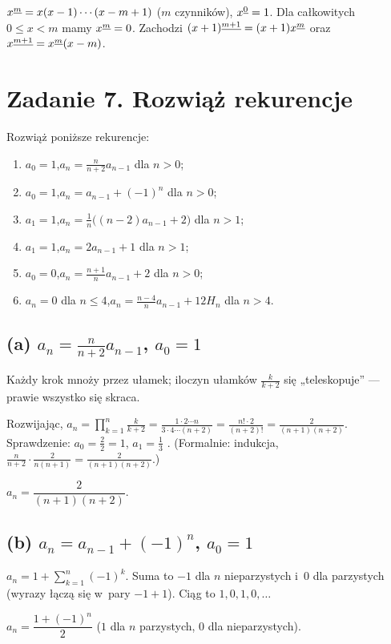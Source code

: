 \documentclass[11pt]{article}
\begin{document}
\begin{definicja}
$x^{\underline{m}} = x(x-1)\cdots(x-m+1)$ ($m$ czynników), $x^{\underline{0}}=1$.
Dla całkowitych $0\le x<m$ mamy $x^{\underline{m}}=0$. Zachodzi
$(x+1)^{\underline{m+1}} = (x+1)x^{\underline{m}}$ oraz $x^{\underline{m+1}} = x^{\underline{m}}(x-m)$.
\end{definicja}

\section{Zadanie 7. Rozwiąż rekurencje}
\begin{tresc}
Rozwiąż poniższe rekurencje:
\begin{enumerate}[label=(\alph*)]
\item $a_0=1$,\quad $a_n=\frac{n}{n+2}a_{n-1}$ dla $n>0$;
\item $a_0=1$,\quad $a_n=a_{n-1}+(-1)^n$ dla $n>0$;
\item $a_1=1$,\quad $a_n=\frac1n\bigl((n-2)a_{n-1}+2\bigr)$ dla $n>1$;
\item $a_1=1$,\quad $a_n=2a_{n-1}+1$ dla $n>1$;
\item $a_0=0$,\quad $a_n=\frac{n+1}{n}a_{n-1}+2$ dla $n>0$;
\item $a_n=0$ dla $n\le4$,\quad $a_n=\frac{n-4}{n}a_{n-1}+12H_n$ dla $n>4$.
\end{enumerate}
\end{tresc}

\subsection*{(a) $a_n=\frac{n}{n+2}a_{n-1}$, $a_0=1$}
\begin{intuicja}
Każdy krok mnoży przez ułamek; iloczyn ułamków $\frac{k}{k+2}$ się „teleskopuje”
--- prawie wszystko się skraca.
\end{intuicja}
\formalnie
Rozwijając, $a_n=\prod_{k=1}^n\frac{k}{k+2} = \frac{1\cdot2\cdots n}{3\cdot4\cdots(n+2)}
= \frac{n!\cdot 2}{(n+2)!} = \frac{2}{(n+1)(n+2)}$.
Sprawdzenie: $a_0=\frac{2}{2}=1$, $a_1=\frac13$ \checkmark. (Formalnie: indukcja,
$\frac{n}{n+2}\cdot\frac{2}{n(n+1)}=\frac{2}{(n+1)(n+2)}$.)
\begin{odpowiedz}$a_n = \dfrac{2}{(n+1)(n+2)}$.\end{odpowiedz}

\subsection*{(b) $a_n=a_{n-1}+(-1)^n$, $a_0=1$}
\formalnie
$a_n = 1+\sum_{k=1}^n(-1)^k$. Suma to $-1$ dla $n$ nieparzystych i~$0$ dla
parzystych (wyrazy łączą się w~pary $-1+1$). Ciąg to $1,0,1,0,\ldots$
\begin{odpowiedz}$a_n=\dfrac{1+(-1)^n}{2}$ ($1$ dla $n$ parzystych, $0$ dla nieparzystych).\end{odpowiedz}
\end{document}
